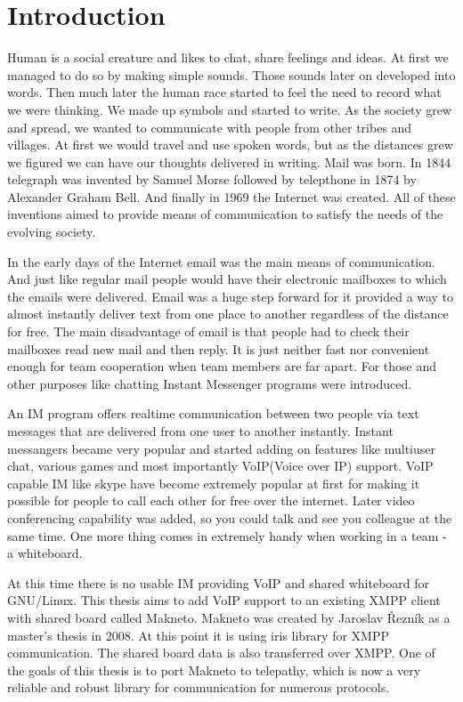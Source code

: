 \linenumbers
\chapter{Introduction}
Human is a social creature and likes to chat, share feelings and ideas. At first we managed to do so by making simple sounds. Those sounds later on developed into words. Then much later the human race started to feel the need to record what we were thinking. We made up symbols and started to write. As the society grew and spread, we wanted to communicate with people from other tribes and villages. At first we would travel and use spoken words, but as the distances grew we figured we can have our thoughts delivered in writing. Mail was born. In 1844 telegraph was invented by Samuel Morse followed by telepthone in 1874 by Alexander Graham Bell. And finally in 1969 the Internet was created. All of these inventions aimed to provide means of communication to satisfy the needs of the evolving society.  

In the early days of the Internet email was the main means of communication. And just like regular mail people would have their electronic mailboxes to which the emails were delivered. Email was a huge step forward for it provided a way to almost instantly deliver text from one place to another regardless of the distance for free. The main disadvantage of email is that people had to check their mailboxes read new mail and then reply. It is just neither fast nor convenient enough for team cooperation when team members are far apart. For those and other purposes like chatting Instant Messenger programs were introduced.    

An IM program offers realtime communication between two people via text messages that are delivered from one user to another instantly. Instant messangers became very popular and started adding on features like multiuser chat, various games and most importantly VoIP(Voice over IP) support. VoIP capable IM like skype have become extremely popular at first for making it possible for people to call each other for free over the internet. Later video conferencing capability was added, so you could talk and see you colleague at the same time. One more thing comes in extremely handy when working in a team - a whiteboard.

At this time there is no usable IM providing VoIP and shared whiteboard for GNU/Linux. This thesis aims to add VoIP support to an existing XMPP client with shared board called Makneto. Makneto was created by Jaroslav Řezník as a master's thesis in 2008. At this point it is using iris library for XMPP communication. The shared board data is also transferred over XMPP. One of the goals of this thesis is to port Makneto to telepathy, which is now a very reliable and robust library for communication for numerous protocols.  

